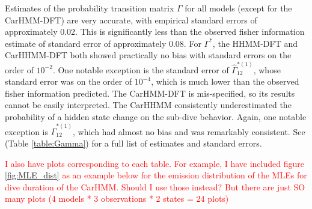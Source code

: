 
Estimates of the probability transition matrix $\Gamma$ for all models (except for the CarHMM-DFT) are very accurate, with empirical standard errors of approximately 0.02. This is significantly less than the observed fisher information estimate of standard error of approximately 0.08.
For $\Gamma^*$, the HHMM-DFT and CarHHMM-DFT both showed practically no bias with standard errors on the order of $10^{-2}$. One notable exception is the standard error of $\hat \Gamma^{*(1)}_{12}$, whose standard error was on the order of $10^{-4}$, which is much lower than the observed fisher information predicted. The CarHMM-DFT is mis-specified, so its results cannot be easily interpreted. The CarHHMM consistently underestimated the probability of a hidden state change on the sub-dive behavior. Again, one notable exception is $\hat \Gamma^{*(1)}_{12}$, which had almost no bias and was remarkably consistent. See (Table \ref{table:Gamma}) for a full list of estimates and standard errors.

\textcolor{red}{I also have plots corresponding to each table. For example, I have included figure \ref{fig:MLE_dist} as an example below for the emission distribution of the MLEs for dive duration of the CarHMM. Should I use those instead? But there are just SO many plots (4 models * 3 observations * 2 states = 24 plots)}